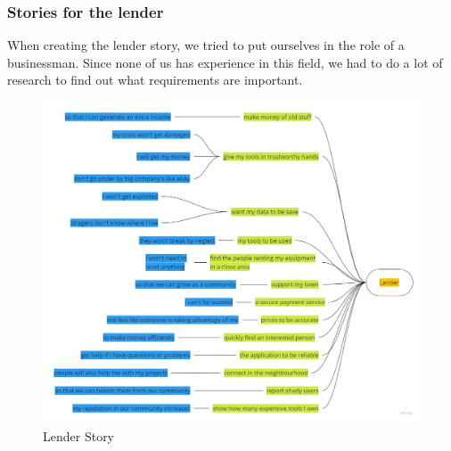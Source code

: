 \subsubsection{Stories for the lender}
When creating the lender story, we tried to put ourselves in the role of a businessman. Since none of us has experience in this field, we had to do a lot of research to find out what requirements are important.
\begin{figure}[H]
	\centering
	\includegraphics[width=\linewidth]{abb/2_context_of_use/story_lending.jpg}
	\caption{Lender Story}
	\label{fig:story_lender}
\end{figure}

